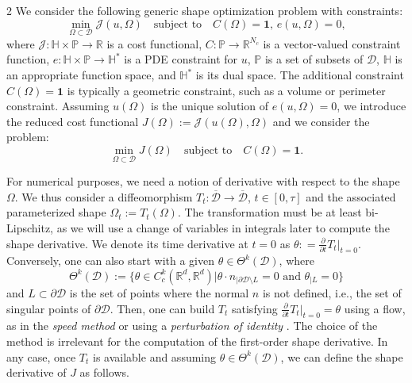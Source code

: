 \documentclass[a4paper, oneside]{article}
\newcommand{\hold}{\mathcal{D}}
\newcommand{\Om}{\Omega}
\newcommand{\VV}{\theta}
\newcommand{\R}{\mathds{R}}
\newcommand{\singset}{L}
\begin{document}
\begin{multicols}{2}
We consider the following generic shape optimization problem with constraints:
\begin{equation} \label{eq:problem0}
	\min_{\Omega\subset\mathcal{D}} \mathcal{J}(u,\Omega)
	\quad \text{subject to} \quad C(\Omega) = \boldsymbol{1}, \, e(u,\Om)=0,
\end{equation}
where $\mathcal{J}: \mathbb{H}\times \mathds{P}\to\R$ is a cost functional, 
$C: \mathds{P}\to\R^{N_c}$ is a vector-valued constraint function,
$e: \mathbb{H}\times \mathds{P}\to\mathbb{H}^*$ is a PDE constraint for $u$,
$\mathds{P}$ is a set of subsets of $\hold$,
$\mathbb{H}$ is an appropriate function space, and $\mathbb{H}^*$ is its dual space.
The additional constraint $C(\Omega) = \boldsymbol{1}$ is typically a geometric constraint, such as a volume or perimeter constraint.
Assuming $u(\Om)$ is the unique solution of $e(u,\Om)=0$,  we introduce the reduced cost functional $J(\Om):= \mathcal{J}(u(\Om),\Om)$ and we consider the problem:
\begin{equation} \label{eq:problem}
	\min_{\Omega\subset\mathcal{D}} J(\Omega)
	\quad \text{subject to} \quad C(\Omega) = \boldsymbol{1}.
\end{equation}

For numerical purposes, we need a notion of derivative with respect to the shape $\Om$.
We thus consider a diffeomorphism $T_t:\overline{\hold}\to\overline{\hold}$, $t\in [0,\tau]$ and the associated parameterized shape $\Om_t := T_t(\Om)$.
The transformation must be at least bi-Lipschitz, as we will use a change of variables in integrals later to compute the shape derivative.
We denote its time derivative at $t=0$ as $\VV: = \frac{\partial}{\partial t} T_t|_{t=0}$.
Conversely, one can also start with a given $\VV\in\Theta^k(\hold)$, where
$$ \Theta^k(\hold) := \{\VV\in C^k_c(\R^d,\R^d)| \VV\cdot n_{|\partial\hold\setminus \singset} = 0 \mbox{ and } \VV_{|\singset} = 0\}$$
and $\singset\subset\partial\hold$ is the set of points where the normal $n$ is not defined, i.e., the set of singular points of $\partial\hold$.
Then, one can build $T_t$ satisfying $\frac{\partial}{\partial t} T_t|_{t=0} = \VV$ using a flow, as in the {\it speed method}
\cite{MR2731611,SokZol92} or using a {\it perturbation of identity} \cite{MR2512810}.
The choice of the method is irrelevant for the computation of the first-order shape derivative.
In any case, once $T_t$ is available and assuming  $\VV\in\Theta^k(\hold)$, we can define the shape derivative of $J$ as follows.


\end{multicols}
\end{document}
